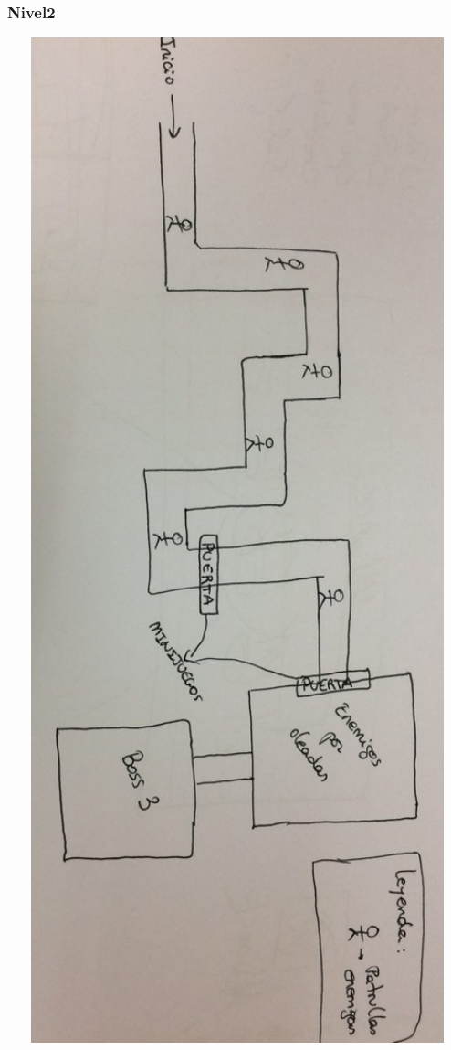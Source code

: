 \documentclass[11pt, twoside]{article}
\begin{document}
\subsubsection{Nivel2}
\includegraphics[angle=90,width=16cm]{./images/Mapa2.png}
\end{document}
